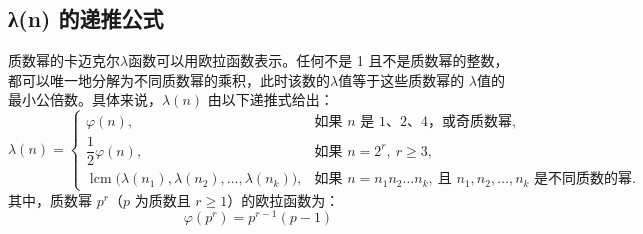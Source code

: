 \subsection{λ(n) 的递推公式}
质数幂的卡迈克尔$\lambda$函数可以用欧拉函数表示。任何不是 1 且不是质数幂的整数，都可以唯一地分解为不同质数幂的乘积，此时该数的$\lambda$值等于这些质数幂的 $\lambda$值的最小公倍数。具体来说，$\lambda(n)$ 由以下递推式给出：
$$
\lambda(n) =
\begin{cases}
\varphi(n), & \text{如果 } n \text{ 是 1、2、4，或奇质数幂}, \\[6pt]
\dfrac{1}{2} \varphi(n), & \text{如果 } n = 2^{r},\ r \geq 3, \\[8pt]
\operatorname{lcm}\bigl(\lambda(n_{1}),\lambda(n_{2}),\dots,\lambda(n_{k})\bigr), & \text{如果 } n = n_{1} n_{2} \dots n_{k}, \ \text{且 } n_{1},n_{2},\dots,n_{k} \text{ 是不同质数的幂}.
\end{cases}~
$$
其中，质数幂 $p^r$（$p$ 为质数且 $r \geq 1$）的欧拉函数为：
$$
\varphi(p^{r}) = p^{r-1}(p - 1)~
$$
